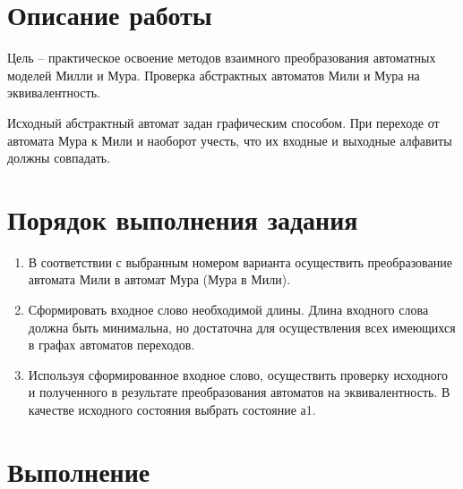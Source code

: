 
\def \labnum {1}
\def \labsubj {Теория автоматов}
\def \labauthor {Чебыкин И. Б.}
\def \labgroup {P3301}
\def \labinsp {Ожиганов А. А.}
\def \labname {Вариант: 12}
\isnametrue

\usepackage{listings,longtable,amsmath,amsfonts,graphicx,tikz,tabularx,pgf}
\usepackage{caption}
\usetikzlibrary{arrows,automata}

\captionsetup{labelsep=period}
\pagestyle{fancy}



\section{Описание работы}
Цель -- практическое освоение методов взаимного преобразования автоматных
моделей Милли и Мура. Проверка абстрактных автоматов Мили и Мура на эквивалентность.

Исходный абстрактный автомат задан графическим способом. При переходе
от автомата Мура к Мили и наоборот учесть, что их входные и выходные алфавиты
должны совпадать.
\section{Порядок выполнения задания}
\begin{enumerate}
\item В соответствии с выбранным номером варианта осуществить преобразование автомата Мили в автомат Мура (Мура в Мили).
\item Сформировать входное слово необходимой длины. Длина входного слова должна быть минимальна, но достаточна для осуществления всех имеющихся в графах автоматов переходов.
\item Используя сформированное входное слово, осуществить проверку исходного и полученного в результате преобразования автоматов на эквивалентность. В качестве исходного состояния выбрать состояние а1.
\end{enumerate}
\newpage
\section{Выполнение}
